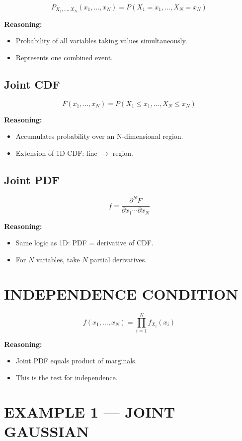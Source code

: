 \documentclass[12pt]{article}
\begin{document}
\[
P_{X_1,\dots,X_N}(x_1,\dots,x_N) = P(X_1 = x_1, \dots, X_N = x_N)
\]

\textbf{Reasoning:}
\begin{itemize}
    \item Probability of all variables taking values simultaneously.
    \item Represents one combined event.
\end{itemize}

\subsection{Joint CDF}

\[
F(x_1,\dots,x_N) = P(X_1 \le x_1, \dots, X_N \le x_N)
\]

\textbf{Reasoning:}
\begin{itemize}
    \item Accumulates probability over an N-dimensional region.
    \item Extension of 1D CDF: line $\rightarrow$ region.
\end{itemize}

\subsection{Joint PDF}

\[
f = \frac{\partial^N F}{\partial x_1 \cdots \partial x_N}
\]

\textbf{Reasoning:}
\begin{itemize}
    \item Same logic as 1D: PDF = derivative of CDF.
    \item For $N$ variables, take $N$ partial derivatives.
\end{itemize}

\section{INDEPENDENCE CONDITION}

\[
f(x_1,\dots,x_N) = \prod_{i=1}^{N} f_{X_i}(x_i)
\]

\textbf{Reasoning:}
\begin{itemize}
    \item Joint PDF equals product of marginals.
    \item This is the test for independence.
\end{itemize}

\section{EXAMPLE 1 — JOINT GAUSSIAN}
\end{document}
